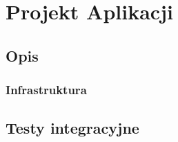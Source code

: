 \chapter{Projekt Aplikacji}
\section{Opis}
\subsection{Infrastruktura}
\section{Testy integracyjne}



